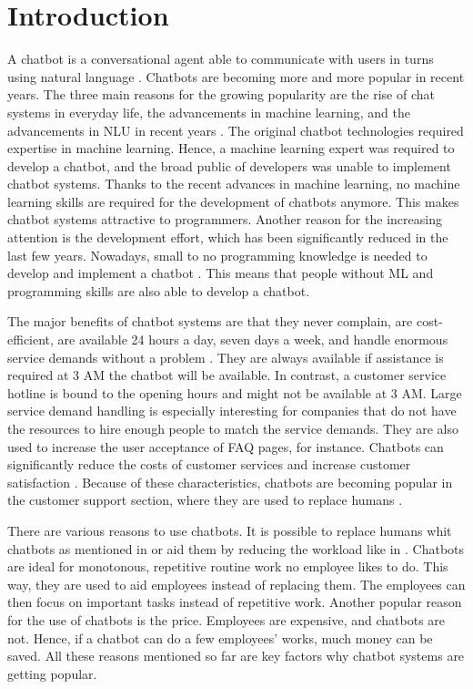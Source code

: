 \section{Introduction} %
A chatbot is a conversational agent able to communicate with users in turns using natural language \cite{evaluateChatbotsShawar2007, shawar2007chatbots, huang2007extracting, gregori2017evaluation}.
Chatbots are becoming more and more popular in recent years.
The three main reasons for the growing popularity are the rise of chat systems in everyday life, the advancements in machine learning, and the advancements in NLU in recent years \cite{braunEvaluatingNLU}.
The original chatbot technologies required expertise in machine learning.
Hence, a machine learning expert was required to develop a chatbot, and the broad public of developers was unable to implement chatbot systems.
Thanks to the recent advances in machine learning, no machine learning skills are required for the development of chatbots anymore.
This makes chatbot systems attractive to programmers. 
Another reason for the increasing attention is the development effort, which has been significantly reduced in the last few years.
Nowadays, small to no programming knowledge is needed to develop and implement a chatbot \cite{braunEvaluatingNLU}.
This means that people without ML and programming skills are also able to develop a chatbot.

The major benefits of chatbot systems are that they never complain, are cost-efficient, are available 24 hours a day, seven days a week, and handle enormous service demands without a problem \cite{singhbuilding}.
They are always available if assistance is required at 3 AM the chatbot will be available. In contrast, a customer service hotline is bound to the opening hours and might not be available at 3 AM.
Large service demand handling is especially interesting for companies that do not have the resources to hire enough people to match the service demands.
They are also used to increase the user acceptance of FAQ pages, for instance.
Chatbots can significantly reduce the costs of customer services and increase customer satisfaction \cite{singhbuilding}. 
Because of these characteristics, chatbots are becoming popular in the customer support section, where they are used to replace humans \cite{GO2019304}.

There are various reasons to use chatbots.
It is possible to replace humans whit chatbots as mentioned in \citet{rahman2017programming} or aid them by reducing the workload like in \citet{deshpande2017survey}.
Chatbots are ideal for monotonous, repetitive routine work no employee likes to do.
This way, they are used to aid employees instead of replacing them.
The employees can then focus on important tasks instead of repetitive work.
Another popular reason for the use of chatbots is the price.
Employees are expensive, and chatbots are not.
Hence, if a chatbot can do a few employees' works, much money can be saved.
All these reasons mentioned so far are key factors why chatbot systems are getting popular.

